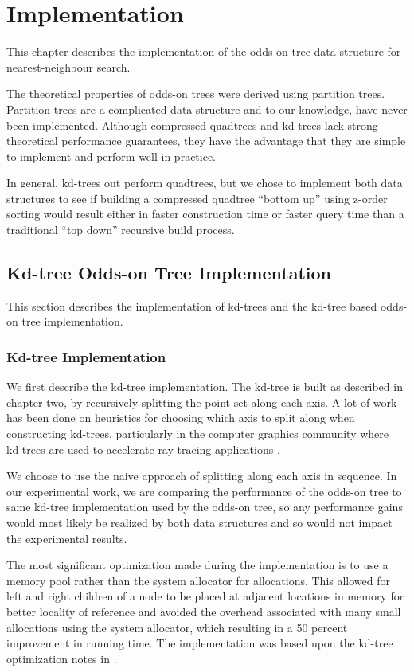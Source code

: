 \documentclass[mcs]{scsthesis}
\begin{document}
\chapter{Implementation}

This chapter describes the implementation of the odds-on tree data structure
for nearest-neighbour search.

The theoretical properties of odds-on trees were derived using partition trees.
Partition trees are a complicated data structure and to our knowledge, have
never been implemented. Although compressed quadtrees and kd-trees lack strong
theoretical performance guarantees, they have the advantage that they are
simple to implement and perform well in practice.

In general, kd-trees out perform quadtrees, but we chose to implement both data
structures to see if building a compressed quadtree ``bottom up'' using z-order
sorting would result either in faster construction time or faster query time
than a traditional ``top down'' recursive build process.

\section{Kd-tree Odds-on Tree Implementation}

This section describes the implementation of kd-trees and the kd-tree based
odds-on tree implementation.

\subsection{Kd-tree Implementation}

We first describe the kd-tree implementation. The kd-tree is built as described
in chapter two, by recursively splitting the point set along each axis.  A lot
of work has been done on heuristics for choosing which axis to split along when
constructing kd-trees, particularly in the computer graphics community where
kd-trees are used to accelerate ray tracing applications
\cite{physicallybasedrendering}.

We choose to use the naive approach of splitting along each axis in sequence.
In our experimental work, we are comparing the performance of the odds-on tree
to same kd-tree implementation used by the odds-on tree, so any performance
gains would most likely be realized by both data structures and so would not
impact the experimental results.

The most significant optimization made during the implementation is to use
a memory pool rather than the system allocator for allocations. This allowed
for left and right children of a node to be placed at adjacent locations in
memory for better locality of reference and avoided the overhead associated
with many small allocations using the system allocator, which resulting in a
50 percent improvement in running time. The implementation was based upon the
kd-tree optimization notes in \cite{physicallybasedrendering}.
\end{document}
